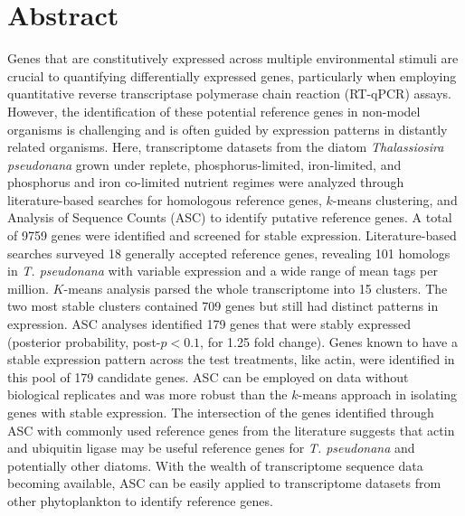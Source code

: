\section{Abstract}
Genes that are constitutively expressed across multiple environmental stimuli are crucial to quantifying differentially expressed genes, particularly when employing quantitative reverse transcriptase polymerase chain reaction (RT-qPCR) assays. However, the identification of these potential reference genes in non-model organisms is challenging and is often guided by expression patterns in distantly related organisms. Here, transcriptome datasets from the diatom \textit{Thalassiosira pseudonana} grown under replete, phosphorus-limited, iron-limited, and phosphorus and iron co-limited nutrient regimes were analyzed through literature-based searches for homologous reference genes, $k$-means clustering, and Analysis of Sequence Counts (ASC) to identify putative reference genes. A total of 9759 genes were identified and screened for stable expression. Literature-based searches surveyed 18 generally accepted reference genes, revealing 101 homologs in \textit{T. pseudonana} with variable expression and a wide range of mean tags per million. $K$-means analysis parsed the whole transcriptome into 15 clusters. The two most stable clusters contained 709 genes but still had distinct patterns in expression. ASC analyses identified 179 genes that were stably expressed (posterior probability, post-$p<0.1$, for 1.25 fold change). Genes known to have a stable expression pattern across the test treatments, like actin, were identified in this pool of 179 candidate genes. ASC can be employed on data without biological replicates and was more robust than the $k$-means approach in isolating genes with stable expression. The intersection of the genes identified through ASC with commonly used reference genes from the literature suggests that actin and ubiquitin ligase may be useful reference genes for \textit{T. pseudonana} and potentially other diatoms. With the wealth of transcriptome sequence data becoming available, ASC can be easily applied to transcriptome datasets from other phytoplankton to identify reference genes.
 
